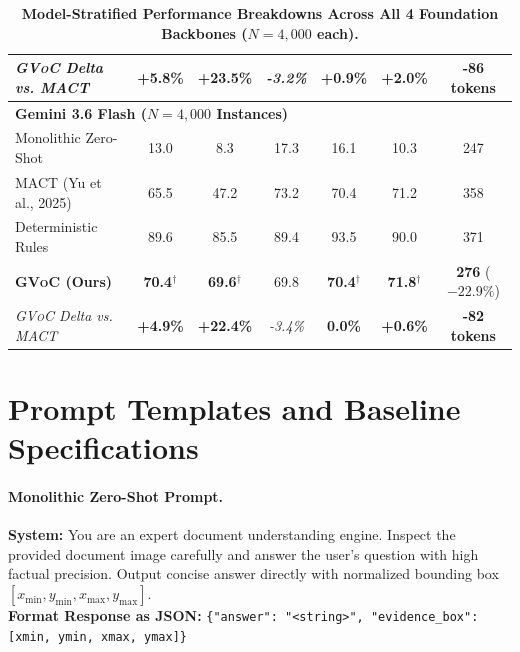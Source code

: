 \documentclass[11pt]{article}
\begin{document}
\begin{table}[t]
{\begin{tabular}{lcccccc}
\textit{\textsc{GVoC} Delta vs. MACT} & \textbf{+5.8\%} & \textbf{+23.5\%} & \textit{-3.2\%} & \textbf{+0.9\%} & \textbf{+2.0\%} & \textbf{-86 tokens} \\
\midrule
\multicolumn{7}{l}{\textbf{Gemini 3.6 Flash ($N = 4,000$ Instances)}} \\
Monolithic Zero-Shot & 13.0 & 8.3 & 17.3 & 16.1 & 10.3 & 247 \\
MACT (Yu et al., 2025) & 65.5 & 47.2 & 73.2 & 70.4 & 71.2 & 358 \\
Deterministic Rules & 89.6 & 85.5 & 89.4 & 93.5 & 90.0 & 371 \\
\textbf{\textsc{GVoC} (Ours)} & \textbf{70.4}$^\dagger$ & \textbf{69.6}$^\dagger$ & 69.8 & \textbf{70.4}$^\dagger$ & \textbf{71.8}$^\dagger$ & \textbf{276} ($-22.9\%$) \\
\textit{\textsc{GVoC} Delta vs. MACT} & \textbf{+4.9\%} & \textbf{+22.4\%} & \textit{-3.4\%} & \textbf{0.0\%} & \textbf{+0.6\%} & \textbf{-82 tokens} \\
\bottomrule
\end{tabular}
}
\vspace{-2mm}
\caption{\textbf{Model-Stratified Performance Breakdowns Across All 4 Foundation Backbones ($N = 4,000$ each).}}
\label{tab:model_breakdowns}
\end{table}

\section{Prompt Templates and Baseline Specifications}
\label{app:prompts}

\paragraph{Monolithic Zero-Shot Prompt.}
\begin{tcolorbox}[colback=gray!5,colframe=gray!50,arc=1mm,boxrule=0.5pt]
\small
\textbf{System:} You are an expert document understanding engine. Inspect the provided document image carefully and answer the user's question with high factual precision. Output concise answer directly with normalized bounding box $[x_{\min}, y_{\min}, x_{\max}, y_{\max}]$. \\
\textbf{Format Response as JSON:} \texttt{\{"answer": "<string>", "evidence\_box": [xmin, ymin, xmax, ymax]\}}
\end{tcolorbox}
\end{document}
